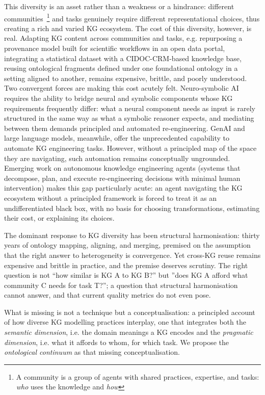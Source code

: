 \documentclass[runningheads]{llncs}
\newcommand{\add}[1]{\textcolor{addedcolor}{#1}}
\begin{document}
\add{This diversity is an asset rather than a weakness or a hindrance: different communities~\footnote{A community is a group of agents with shared practices, expertise, and tasks: \emph{who} uses the knowledge and \emph{how}} and tasks genuinely require different representational choices, thus creating a rich and varied KG ecosystem. The cost of this diversity, however, is real. Adapting KG content across communities and tasks, e.g. repurposing a provenance model built for scientific workflows in an open data portal, integrating a statistical dataset with a CIDOC-CRM-based knowledge base, reusing ontological fragments defined under one foundational ontology in a setting aligned to another, remains expensive, brittle, and poorly understood.
Two convergent forces are making this cost acutely felt. Neuro-symbolic AI requires the ability to bridge neural and symbolic components whose KG requirements frequently differ: what a neural component needs as input is rarely structured in the same way as what a symbolic reasoner expects, and mediating between them demands principled and automated re-engineering. GenAI and large language models, meanwhile, offer the unprecedented capability to automate KG engineering tasks. However, without a principled map of the space they are navigating, such automation remains conceptually ungrounded. Emerging work on autonomous knowledge engineering agents (systems that decompose, plan, and execute re-engineering decisions with minimal human intervention) makes this gap particularly acute: an agent navigating the KG ecosystem without a principled framework is forced to treat it as an undifferentiated black box, with no basis for choosing transformations, estimating their cost, or explaining its choices.}

\add{The dominant response to KG diversity has been structural harmonisation: thirty years of ontology mapping, aligning, and merging, premised on the assumption that the right answer to heterogeneity is convergence. Yet cross-KG reuse remains expensive and brittle in practice, and the premise deserves scrutiny. The right question is not ``how similar is KG A to KG B?'' but ''does KG A afford what community C needs for task T?''; a question that structural harmonisation cannot answer, and that current quality metrics do not even pose.}

\add{What is missing is not a technique but a conceptualisation: a principled account of how diverse KG modelling practices interplay, one that integrates both the \emph{semantic dimension}, i.e. the domain meanings a KG encodes and the \emph{pragmatic dimension}, i.e. what it affords to whom, for which task. We propose the \emph{ontological continuum} as that missing conceptualisation.}
\end{document}
